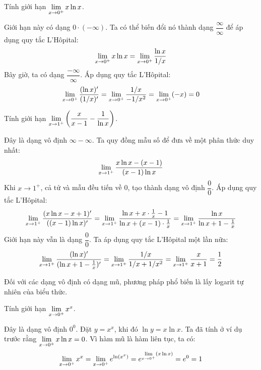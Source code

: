 \begin{example}
Tính giới hạn $\lim\limits_{x \to 0^+} x \ln x$.
\begin{solution}
Giới hạn này có dạng $0 \cdot (-\infty)$. Ta có thể biến đổi nó thành dạng $\dfrac{\infty}{\infty}$ để áp dụng quy tắc L'Hôpital:
$$ \lim\limits_{x \to 0^+} x \ln x = \lim\limits_{x \to 0^+} \dfrac{\ln x}{1/x} $$
Bây giờ, ta có dạng $\dfrac{-\infty}{\infty}$. Áp dụng quy tắc L'Hôpital:
$$ \lim\limits_{x \to 0^+} \dfrac{(\ln x)'}{(1/x)'} = \lim\limits_{x \to 0^+} \dfrac{1/x}{-1/x^2} = \lim\limits_{x \to 0^+} (-x) = 0 $$
\end{solution}
\end{example}

\begin{example}
Tính giới hạn $\lim\limits_{x \to 1^+} \left(\dfrac{x}{x-1} - \dfrac{1}{\ln x}\right)$.
\begin{solution}
Đây là dạng vô định $\infty - \infty$. Ta quy đồng mẫu số để đưa về một phân thức duy nhất:
$$ \lim\limits_{x \to 1^+} \dfrac{x \ln x - (x-1)}{(x-1)\ln x} $$
Khi $x \to 1^+$, cả tử và mẫu đều tiến về 0, tạo thành dạng vô định $\dfrac{0}{0}$. Áp dụng quy tắc L'Hôpital:
$$ \lim\limits_{x \to 1^+} \dfrac{(x \ln x - x + 1)'}{((x-1)\ln x)'} = \lim\limits_{x \to 1^+} \dfrac{\ln x + x\cdot\frac{1}{x} - 1}{\ln x + (x-1)\cdot\frac{1}{x}} = \lim\limits_{x \to 1^+} \dfrac{\ln x}{\ln x + 1 - \frac{1}{x}} $$
Giới hạn này vẫn là dạng $\dfrac{0}{0}$. Ta áp dụng quy tắc L'Hôpital một lần nữa:
$$ \lim\limits_{x \to 1^+} \dfrac{(\ln x)'}{(\ln x + 1 - \frac{1}{x})'} = \lim\limits_{x \to 1^+} \dfrac{1/x}{1/x + 1/x^2} = \lim\limits_{x \to 1^+} \dfrac{x}{x+1} = \dfrac{1}{2} $$
\end{solution}
\end{example}

Đối với các dạng vô định có dạng mũ, phương pháp phổ biến là lấy logarit tự nhiên của biểu thức.

\begin{example}
Tính giới hạn $\lim\limits_{x \to 0^+} x^x$.
\begin{solution}
Đây là dạng vô định $0^0$. Đặt $y = x^x$, khi đó $\ln y = x \ln x$.
Ta đã tính ở ví dụ trước rằng $\lim\limits_{x \to 0^+} x \ln x = 0$.
Vì hàm mũ là hàm liên tục, ta có:
$$ \lim\limits_{x \to 0^+} x^x = \lim\limits_{x \to 0^+} e^{\ln(x^x)} = e^{\lim\limits_{x \to 0^+} (x \ln x)} = e^0 = 1 $$
\end{solution}
\end{example}

